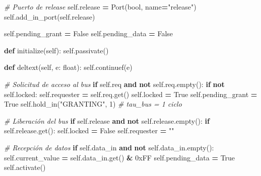 \documentclass[12pt,oneside]{templates/unerthesis}
\newenvironment{Shaded}{\begin{snugshade}}{\end{snugshade}}
\newcommand{\BaseNTok}[1]{\textcolor[rgb]{0.00,0.00,0.81}{#1}}
\newcommand{\BuiltInTok}[1]{#1}
\newcommand{\CommentTok}[1]{\textcolor[rgb]{0.56,0.35,0.01}{\textit{#1}}}
\newcommand{\ControlFlowTok}[1]{\textcolor[rgb]{0.13,0.29,0.53}{\textbf{#1}}}
\newcommand{\DecValTok}[1]{\textcolor[rgb]{0.00,0.00,0.81}{#1}}
\newcommand{\KeywordTok}[1]{\textcolor[rgb]{0.13,0.29,0.53}{\textbf{#1}}}
\newcommand{\NormalTok}[1]{#1}
\newcommand{\OperatorTok}[1]{\textcolor[rgb]{0.81,0.36,0.00}{\textbf{#1}}}
\newcommand{\StringTok}[1]{\textcolor[rgb]{0.31,0.60,0.02}{#1}}
\newcommand{\VariableTok}[1]{\textcolor[rgb]{0.00,0.00,0.00}{#1}}
\begin{document}
\begin{Shaded}
\begin{Highlighting}[]
        \CommentTok{\# Puerto de release}
        \VariableTok{self}\NormalTok{.release }\OperatorTok{=}\NormalTok{ Port(}\BuiltInTok{bool}\NormalTok{, name}\OperatorTok{=}\StringTok{"release"}\NormalTok{)}
        \VariableTok{self}\NormalTok{.add\_in\_port(}\VariableTok{self}\NormalTok{.release)}
        
        \VariableTok{self}\NormalTok{.pending\_grant }\OperatorTok{=} \VariableTok{False}
        \VariableTok{self}\NormalTok{.pending\_data }\OperatorTok{=} \VariableTok{False}
    
    \KeywordTok{def}\NormalTok{ initialize(}\VariableTok{self}\NormalTok{):}
        \VariableTok{self}\NormalTok{.passivate()}
    
    \KeywordTok{def}\NormalTok{ deltext(}\VariableTok{self}\NormalTok{, e: }\BuiltInTok{float}\NormalTok{):}
        \VariableTok{self}\NormalTok{.continuef(e)}
        
        \CommentTok{\# Solicitud de acceso al bus}
        \ControlFlowTok{if} \VariableTok{self}\NormalTok{.req }\KeywordTok{and} \KeywordTok{not} \VariableTok{self}\NormalTok{.req.empty():}
            \ControlFlowTok{if} \KeywordTok{not} \VariableTok{self}\NormalTok{.locked:}
                \VariableTok{self}\NormalTok{.requester }\OperatorTok{=} \VariableTok{self}\NormalTok{.req.get()}
                \VariableTok{self}\NormalTok{.locked }\OperatorTok{=} \VariableTok{True}
                \VariableTok{self}\NormalTok{.pending\_grant }\OperatorTok{=} \VariableTok{True}
                \VariableTok{self}\NormalTok{.hold\_in(}\StringTok{"GRANTING"}\NormalTok{, }\DecValTok{1}\NormalTok{)  }\CommentTok{\# tau\_bus = 1 ciclo}
        
        \CommentTok{\# Liberación del bus}
        \ControlFlowTok{if} \VariableTok{self}\NormalTok{.release }\KeywordTok{and} \KeywordTok{not} \VariableTok{self}\NormalTok{.release.empty():}
            \ControlFlowTok{if} \VariableTok{self}\NormalTok{.release.get():}
                \VariableTok{self}\NormalTok{.locked }\OperatorTok{=} \VariableTok{False}
                \VariableTok{self}\NormalTok{.requester }\OperatorTok{=} \StringTok{""}
        
        \CommentTok{\# Recepción de datos}
        \ControlFlowTok{if} \VariableTok{self}\NormalTok{.data\_in }\KeywordTok{and} \KeywordTok{not} \VariableTok{self}\NormalTok{.data\_in.empty():}
            \VariableTok{self}\NormalTok{.current\_value }\OperatorTok{=} \VariableTok{self}\NormalTok{.data\_in.get() }\OperatorTok{\&} \BaseNTok{0xFF}
            \VariableTok{self}\NormalTok{.pending\_data }\OperatorTok{=} \VariableTok{True}
            \VariableTok{self}\NormalTok{.activate()}
    

\end{Highlighting}
\end{Shaded}
\end{document}
